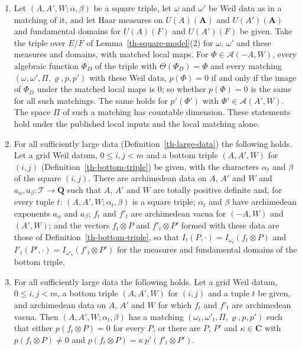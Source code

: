 \begin{lemma}
\begin{enumerate}
  $p(\Phi)=p'(\Phi_0)$.
\item Let $(A,A',W;\alpha,\beta)$ be a square triple, let $\omega$ and
  $\omega'$ be Weil data as in a matching of it, and let Haar measures on
  $U(A)(\mathbf A)$ and $U(A')(\mathbf A)$ and fundamental domains for
  $U(A)(F)$ and $U(A')(F)$ be given. Take the triple over $E/F$ of
  Lemma~\ref{th-square-model}(2) for $\omega$, $\omega'$ and these measures and
  domains, with matched local maps. For $\Phi\in\mathcal A(-A,W)$, every
  algebraic function $\Phi_D$ of the triple with $\Theta(\Phi_D)=\Phi$ and
  every matching $(\omega,\omega',\Pi,\varrho,p,p')$ with these Weil data,
  $p(\Phi)=0$ if and only if the image of $\Phi_D$ under the matched local
  maps is $0$; so whether $p(\Phi)=0$ is the same for all such matchings. The
  same holds for $p'(\Phi')$ with $\Phi'\in\mathcal A(A',W)$. The space $\Pi$ of
  such a matching has countable dimension. These statements hold under the
  published local inputs and the local matching alone.
\item For all sufficiently large data (Definition~\ref{th-large-data}) the
  following holds. Let a grid Weil datum, $0\leq i,j<m$ and a bottom triple
  $(A,A',W)$ for $(i,j)$ (Definition~\ref{th-bottom-triple}) be given, with the
  characters $\alpha_t$ and $\beta$ of the square $(i,j)$. There are
  archimedean data on $A$, $A'$ and $W$ and
  $a_\alpha,a_\beta\colon\mathcal T\to\mathbf Q$ such that $A$, $A'$ and $W$
  are totally positive definite and, for every tuple $t$:
  $(A,A',W;\alpha_t,\beta)$ is a square triple; $\alpha_t$ and $\beta$ have
  archimedean exponents $a_\alpha$ and $a_\beta$; $f_t$ and $f'_t$ are
  archimedean vacua for $(-A,W)$ and $(A',W)$; and the vectors $f_t\otimes P$
  and $f'_t\otimes P'$ formed with these data are those of
  Definition~\ref{th-bottom-triple}, so that $I_t(P,\cdot)=I_{\omega_t}(f_t\otimes P)$
  and $I'_t(P',\cdot)=I_{\omega'_t}(f'_t\otimes P')$ for the measures and
  fundamental domains of the bottom triple.
\item For all sufficiently large data the following holds. Let a grid Weil
  datum, $0\leq i,j<m$, a bottom triple $(A,A',W)$ for $(i,j)$ and a tuple $t$
  be given, and archimedean data on $A$, $A'$ and $W$ for which $f_t$ and
  $f'_t$ are archimedean vacua. Then $(A,A',W;\alpha_t,\beta)$ has a matching
  $(\omega_t,\omega'_t,\Pi,\varrho,p,p')$ such that either
  $p(f_t\otimes P)=0$ for every $P$, or there are $P$, $P'$ and
  $\kappa\in\mathbf C$ with $p(f_t\otimes P)\neq0$ and
  $p(f_t\otimes P)=\kappa\,p'(f'_t\otimes P')$.
\end{enumerate}
\end{lemma}
